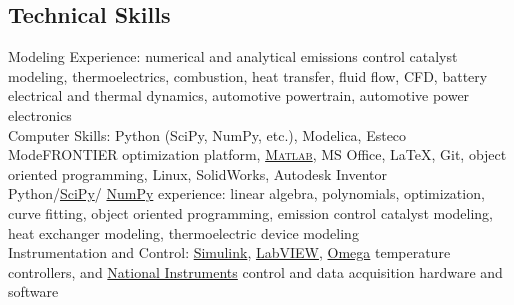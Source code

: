 \documentclass[centered]{res}
\begin{document}
\begin{resume}
\section{Technical Skills}
% 
Modeling Experience: numerical and analytical emissions control
catalyst modeling, thermoelectrics, combustion, heat transfer, fluid
flow, CFD, battery electrical and thermal dynamics, automotive
powertrain, automotive power electronics
\vspace{5pt} \\
Computer Skills: Python (SciPy, NumPy, etc.), Modelica, Esteco
ModeFRONTIER optimization platform,
\href{http://www.mathworks.com/products/matlab/}{\textsc{Matlab}}, MS
Office, \LaTeX, Git, object oriented programming, Linux, SolidWorks,
Autodesk Inventor
\vspace{5pt} \\
%
Python/\href{http://www.scipy.org/}{SciPy}/%
\href{http://numpy.scipy.org/}{NumPy}
experience: linear algebra, polynomials, optimization, curve fitting,
object oriented programming, emission control catalyst modeling, heat
exchanger modeling, thermoelectric device modeling
\vspace{5pt} \\
%
Instrumentation and Control:
\href{http://www.mathworks.com/products/simulink/}{Simulink},
\href{http://www.ni.com/}{LabVIEW},
\href{http://www.omega.com/}{Omega} temperature controllers, and
\href{http://www.ni.com}{National Instruments} control and data
acquisition hardware and software
%

\end{resume}
\end{document}
